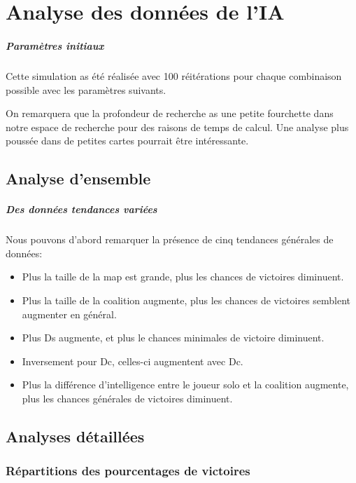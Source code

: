\chapter{Analyse des données de l'IA}

\paragraph{Paramètres initiaux}
Cette simulation as été réalisée avec 100 réitérations pour chaque combinaison possible avec les paramètres suivants.

\begin{info}
	On remarquera que la profondeur de recherche as une petite fourchette dans notre espace de recherche pour des raisons de temps de calcul. Une analyse plus poussée dans de petites cartes pourrait être intéressante.
\end{info}

\section{Analyse d'ensemble}
\paragraph{Des données tendances variées}
Nous pouvons d'abord remarquer la présence de cinq tendances générales de données:
\begin{itemize}
	\item Plus la taille de la map est grande, plus les chances de victoires diminuent.
	\item Plus la taille de la coalition augmente, plus les chances de victoires semblent augmenter en général.
	\item Plus Ds augmente, et plus le chances minimales de victoire diminuent.
	\item Inversement pour Dc, celles-ci augmentent avec Dc.
	\item Plus la différence d'intelligence entre le joueur solo et la coalition augmente, plus les chances générales de victoires diminuent.
\end{itemize}



\section{Analyses détaillées}
\subsection{Répartitions des pourcentages de victoires}
